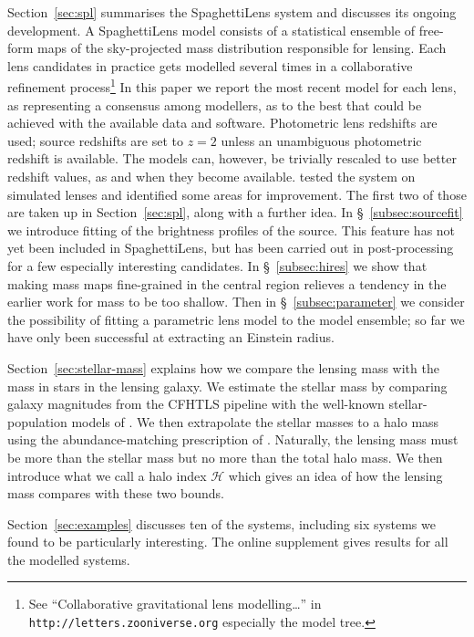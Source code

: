 \documentclass[fleqn,usenatbib]{mnras}
\newcommand{\haloindex}{\mathcal{H}}
\begin{document}
Section~\ref{sec:spl} summarises the SpaghettiLens system and
discusses its ongoing development. A SpaghettiLens model consists of a
statistical ensemble of free-form maps of the sky-projected mass
distribution responsible for lensing.  Each lens candidates in
practice gets modelled several times in a collaborative refinement
process\footnote{See ``Collaborative gravitational lens
  modelling\dots'' in {\tt http://letters.zooniverse.org} especially
  the model tree.}  In this paper we report the most recent model for
each lens, as representing a consensus among modellers, as to the best
that could be achieved with the available data and software.
Photometric lens redshifts are used; source redshifts are set to
$z=2$ unless an unambiguous photometric redshift is available.
The models can, however, be trivially rescaled to use better
redshift values, as and when they become available.
\cite{2015MNRAS.447.2170K} tested the system on simulated lenses and
identified some areas for improvement.  The first two of those are
taken up in Section~\ref{sec:spl}, along with a further idea. In
\S~\ref{subsec:sourcefit} we introduce fitting of the brightness
profiles of the source.  This feature has not yet been included in
SpaghettiLens, but has been carried out in post-processing for a few
especially interesting candidates.  In \S~\ref{subsec:hires} we show
that making mass maps fine-grained in the central region relieves a
tendency in the earlier work for mass to be too shallow. Then in
\S~\ref{subsec:parameter} we consider the possibility of fitting a
parametric lens model to the model ensemble; so far we have only been
successful at extracting an Einstein radius.

Section~\ref{sec:stellar-mass} explains how we compare the lensing
mass with the mass in stars in the lensing galaxy.  We estimate the
stellar mass by comparing galaxy magnitudes from the CFHTLS pipeline
with the well-known stellar-population models of
\cite{2003MNRAS.344.1000B}.  We then extrapolate the stellar masses to
a halo mass using the abundance-matching prescription of
\cite{2010ApJ...710..903M}.  Naturally, the lensing mass must be more
than the stellar mass but no more than the total halo mass.  We then
introduce what we call a halo index $\haloindex$ which gives an idea
of how the lensing mass compares with these two bounds.

Section~\ref{sec:examples} discusses ten of the systems, including six
systems we found to be particularly interesting.  The online
supplement gives results for all the modelled systems.
\end{document}

